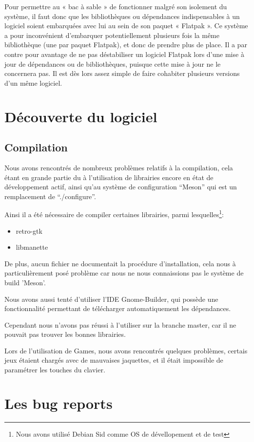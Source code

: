 \documentclass[12pt]{report}
\begin{document}
Pour permettre au « bac à sable » de fonctionner malgré son isolement
du système, il faut donc que les bibliothèques ou dépendances
indispensables à un logiciel soient embarquées avec lui au sein de son
paquet « Flatpak ». Ce système a pour inconvénient d'embarquer
potentiellement plusieurs fois la même bibliothèque (une par paquet
Flatpak), et donc de prendre plus de place. Il a par contre pour
avantage de ne pas déstabiliser un logiciel Flatpak lors d'une mise à
jour de dépendances ou de bibliothèques, puisque cette mise à jour ne
le concernera pas. Il est dès lors assez simple de faire cohabiter
plusieurs versions d'un même logiciel.

\section{Découverte du logiciel}
\subsection{Compilation}
Nous avons rencontrés de nombreux problèmes relatifs à la compilation,
cela étant en grande partie du à l'utilisation de librairies encore en
état de développement actif, ainsi qu'au système de configuration
``Meson'' qui est un remplacement de ``./configure''.

Ainsi il a été nécessaire de compiler certaines librairies, parmi
lesquelles\footnote{Nous avons utilisé Debian Sid comme OS de dévellopement et de test}:
\begin{itemize}
\item retro-gtk
\item libmanette
\end{itemize}

De plus, aucun fichier ne documentait la procédure d'installation,
cela nous à particulièrement posé problème car nous ne nous
connaissions pas le système de build 'Meson'.

Nous avons aussi tenté d'utiliser l'IDE Gnome-Builder, qui possède une
fonctionnalité permettant de télécharger automatiquement les
dépendances.

Cependant nous n'avons pas réussi à l'utiliser sur la branche master,
car il ne pouvait pas trouver les bonnes librairies.

Lors de l'utilisation de Games, nous avons rencontrés quelques
problèmes, certais jeux étaient chargés avec de mauvaises jaquettes,
et il était impossible de paramétrer les touches du clavier.

\section{Les bug reports}
\end{document}
